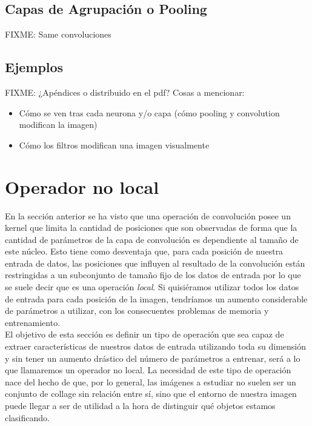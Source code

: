 \section{Capas de Agrupación o Pooling}

FIXME: Same convoluciones

\section{Ejemplos}

FIXME: ¿Apéndices o distribuido en el pdf? Cosas a mencionar:

\begin{itemize}
\item Cómo se ven tras cada neurona y/o capa (cómo pooling y convolution modifican la imagen)
\item Cómo los filtros modifican una imagen visualmente
\end{itemize}

\chapter{Operador no local}
En la sección anterior se ha visto que una operación de convolución posee un kernel que limita la cantidad de posiciones que son observadas de forma que la cantidad de parámetros de la capa de convolución es dependiente al tamaño de este núcleo. Esto tiene como desventaja que, para cada posición de nuestra entrada de datos, las posiciones que influyen al resultado de la convolución están restringidas a un subconjunto de tamaño fijo de los datos de entrada por lo que se suele decir que es una operación \emph{local}. Si quisiéramos utilizar todos los datos de entrada para cada posición de la imagen, tendríamos un aumento considerable de parámetros a utilizar, con los consecuentes problemas de memoria y entrenamiento.\\

El objetivo de esta sección es definir un tipo de operación que sea capaz de extraer características de nuestros datos de entrada utilizando toda su dimensión y sin tener un aumento drástico del número de parámetros a entrenar, será a lo que llamaremos un operador no local. La necesidad de este tipo de operación nace del hecho de que, por lo general, las imágenes a estudiar no suelen ser un conjunto de collage sin relación entre sí, sino que el entorno de nuestra imagen puede llegar a ser de utilidad a la hora de distinguir qué objetos estamos clasificando.\\

